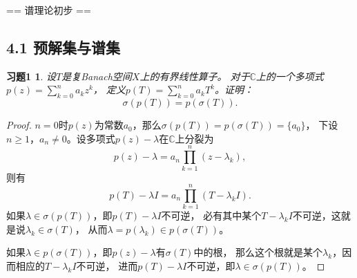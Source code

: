 \newcommand{\s}{\sigma}
\newcommand{\la}{\langle}
\newcommand{\ra}{\rangle}
\newcommand{\B}{\mathfrak{B}}
\newcommand{\K}{\mathcal{K}}
\newcommand{\rr}{\mathfrak{R}}
\newcommand{\ind}{\operatorname{ind}}
\theoremstyle{plain}\newtheorem*{1}{习题1}
\theoremstyle{plain}\newtheorem*{2}{习题2}
\theoremstyle{plain}\newtheorem*{3}{习题3}
\theoremstyle{plain}\newtheorem*{4}{习题4}
\theoremstyle{plain}\newtheorem*{5}{习题5}
\theoremstyle{plain}\newtheorem*{6}{习题6}
\theoremstyle{plain}\newtheorem*{7}{习题7}
\theoremstyle{plain}\newtheorem*{8}{习题8}
\theoremstyle{plain}\newtheorem*{9}{习题9}
\theoremstyle{plain}\newtheorem*{10}{习题10}
\theoremstyle{plain}\newtheorem*{11}{习题11}
\theoremstyle{plain}\newtheorem*{12}{习题12}
\theoremstyle{plain}\newtheorem*{13}{习题13}
\theoremstyle{plain}\newtheorem*{14}{习题14}
\theoremstyle{plain}\newtheorem*{15}{习题15}
\theoremstyle{plain}\newtheorem*{16}{习题16}
\theoremstyle{plain}\newtheorem*{17}{习题17}
\theoremstyle{plain}\newtheorem*{18}{习题18}
\theoremstyle{plain}\newtheorem*{20}{习题20}
\theoremstyle{plain}\newtheorem*{21}{习题21}
\theoremstyle{remark}\newtheorem*{remark*}{注}
\theoremstyle{definition}\newtheorem*{definition*}{定义}

\setcounter{section}{3}

== 谱理论初步 ==

\subsection{4.1 预解集与谱集}
\begin{1}
    设$T$是复Banach空间$X$上的有界线性算子。
    对于$\mathbb{C}$上的一个多项式$\displaystyle p(z)=\sum_{k=0}^na_kz^k$，
    定义$\displaystyle p(T)=\sum_{k=0}^na_kT^k$。证明：
    \[\s(p(T))=p(\s(T)).\]
\end{1}
\begin{proof}
    $n=0$时$p(z)$为常数$a_0$，那么$\s(p(T))=p(\s(T))=\{a_0\}$，
    下设$n\geqslant1$，$a_n\ne0$。设多项式$p(z)-\lambda$在$\mathbb{C}$上分裂为
    \[p(z)-\lambda=a_n\prod_{k=1}^n(z-\lambda_k),\]
    则有
    \[p(T)-\lambda I=a_n\prod_{k=1}^n(T-\lambda_kI).\]
    如果$\lambda\in\s(p(T))$，即$p(T)-\lambda I$不可逆，
    必有其中某个$T-\lambda_kI$不可逆，这就是说$\lambda_k\in\s(T)$，
    从而$\lambda=p(\lambda_k) \in p(\s(T))$。

    如果$\lambda \in p(\s(T))$，即$p(z)-\lambda$有$\s(T)$中的根，
    那么这个根就是某个$\lambda_k$，因而相应的$T-\lambda_k I$不可逆，
    进而$p(T)-\lambda I$不可逆，即$\lambda\in\s(p(T))$。
\end{proof}

